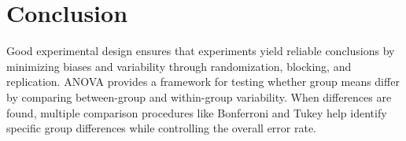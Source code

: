 \documentclass{article}
\begin{document}
\section{Conclusion}
Good experimental design ensures that experiments yield reliable conclusions by minimizing biases and variability through randomization, blocking, and replication. ANOVA provides a framework for testing whether group means differ by comparing between-group and within-group variability. When differences are found, multiple comparison procedures like Bonferroni and Tukey help identify specific group differences while controlling the overall error rate.



\end{document}
